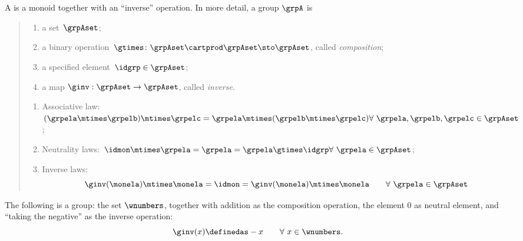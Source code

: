 

\section{}\label{sec:groups}


\begin{ctdefinition}[Group]
  \label{def:group}
  A \emph{} is a monoid together with an ``inverse'' operation.
  In more detail, a group $\grpA$ is
  \begin{quote}
    \constit
    \begin{enumerate}
      \item a set~$\grpAset$;
      \item a binary operation~$\gtimes \colon \grpAset \cartprod \grpAset \sto \grpAset$, called \emph{composition};
      \item a specified element~$\idgrp \in \grpAset$;
      \item a map $\ginv: \grpAset \to \grpAset$, called \emph{inverse}.
    \end{enumerate}
    \condit
    \begin{enumerate}
      \item Associative law:~$(\grpela\mtimes \grpelb)\mtimes \grpelc=\grpela\mtimes (\grpelb\mtimes \grpelc) \hfill \forall \  \grpela, \grpelb, \grpelc \in \grpAset$;
      \item Neutrality laws:~$\idmon\mtimes \grpela=\grpela=\grpela \gtimes \idgrp \hfill \forall \  \grpela \in \grpAset$;
      \item Inverse laws:
      \begin{equation}\label{eq:group-inverse-law}
        \ginv(\monela) \mtimes \monela = \idmon = \ginv(\monela) \mtimes \monela \quad \quad \forall \  \grpela  \in \grpAset
      \end{equation}
    \end{enumerate}
  \end{quote}
\end{ctdefinition}

\begin{example}
The following is a group: the set $\wnumbers$, together with addition as the composition operation, the element $0$ as neutral element, and ``taking the negative'' as the inverse operation:
\begin{equation}
\ginv(x) \definedas -x \quad \quad \forall \ x \in \wnumbers.
\end{equation}
\end{example}


